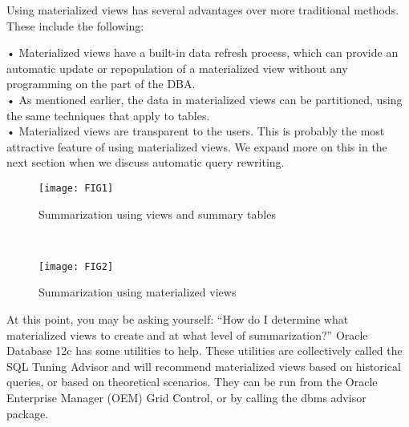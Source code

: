 Using materialized views has several advantages over more traditional methods. These include the following:

• Materialized views have a built-in data refresh process, which can provide an automatic update or repopulation of a materialized view without any programming on the part of the DBA.\\
• As mentioned earlier, the data in materialized views can be partitioned, using the same techniques that apply to tables.\\
• Materialized views are transparent to the users. This is probably the most attractive feature of using materialized views. We expand more on this in the next section when we discuss automatic query rewriting.\\
\begin{figure}[ht!]
    \centering
    \texttt{[image: FIG1]}
    \caption{Summarization using views and summary tables}
    \label{fig_21}
\end{figure}
\\
\begin{figure}[ht!]
    \centering
    \texttt{[image: FIG2]}
    \caption{Summarization using materialized views}
    \label{fig_21}
\end{figure}
At this point, you may be asking yourself: “How do I determine what materialized views to create and at what level of summarization?” Oracle Database 12c has some utilities to help. These utilities are collectively called the SQL Tuning Advisor and will recommend materialized views based on historical queries, or based on theoretical scenarios. They can be run from the Oracle Enterprise Manager (OEM) Grid Control, or by calling the dbms advisor package.
\clearpage